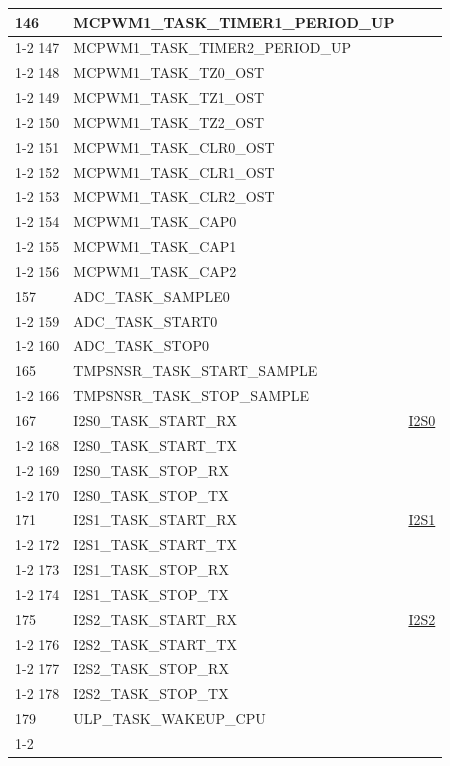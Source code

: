\documentclass[main\_\_CN.tex]{subfiles}
\begin{document}
\begin{longtable}{ | l | l | l | }
146 & MCPWM1\_TASK\_TIMER1\_PERIOD\_UP      & \\ \cline{1-2}
147 & MCPWM1\_TASK\_TIMER2\_PERIOD\_UP      & \\ \cline{1-2}
148 & MCPWM1\_TASK\_TZ0\_OST  & \\ \cline{1-2}
149 & MCPWM1\_TASK\_TZ1\_OST  & \\ \cline{1-2}
150 & MCPWM1\_TASK\_TZ2\_OST  & \\ \cline{1-2}
151 & MCPWM1\_TASK\_CLR0\_OST & \\ \cline{1-2}
152 & MCPWM1\_TASK\_CLR1\_OST & \\ \cline{1-2}
153 & MCPWM1\_TASK\_CLR2\_OST & \\ \cline{1-2}
154 & MCPWM1\_TASK\_CAP0      & \\ \cline{1-2}
155 & MCPWM1\_TASK\_CAP1      & \\ \cline{1-2}
156 & MCPWM1\_TASK\_CAP2      & \\ \hline
157 & ADC\_TASK\_SAMPLE0     & \nameref{mod:adc}   \\ \cline{1-2}
159 & ADC\_TASK\_START0      & \\ \cline{1-2}
160 & ADC\_TASK\_STOP0& \\ \hline
165 & TMPSNSR\_TASK\_START\_SAMPLE  & \nameref{mod:tmpsen}      \\ \cline{1-2}
166 & TMPSNSR\_TASK\_STOP\_SAMPLE   & \\ \hline
167 & I2S0\_TASK\_START\_RX   & \hyperref[mod:i2s]{I2S0}   \\ \cline{1-2}
168 & I2S0\_TASK\_START\_TX   & \\ \cline{1-2}
169 & I2S0\_TASK\_STOP\_RX    & \\ \cline{1-2}
170 & I2S0\_TASK\_STOP\_TX    & \\ \hline
171 & I2S1\_TASK\_START\_RX   & \hyperref[mod:i2s]{I2S1}   \\ \cline{1-2}
172 & I2S1\_TASK\_START\_TX   & \\ \cline{1-2}
173 & I2S1\_TASK\_STOP\_RX    & \\ \cline{1-2}
174 & I2S1\_TASK\_STOP\_TX    & \\ \hline
175 & I2S2\_TASK\_START\_RX   & \hyperref[mod:i2s]{I2S2}   \\ \cline{1-2}
176 & I2S2\_TASK\_START\_TX   & \\ \cline{1-2}
177 & I2S2\_TASK\_STOP\_RX    & \\ \cline{1-2}
178 & I2S2\_TASK\_STOP\_TX    & \\ \hline
179 & ULP\_TASK\_WAKEUP\_CPU & \nameref{mod:ulp} \\ \cline{1-2}

\end{longtable}
\end{document}
